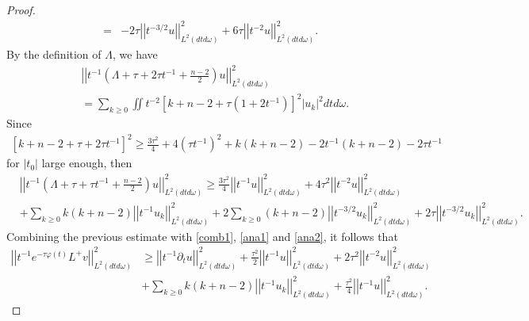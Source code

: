 \documentclass[11pt]{amsart}
\theoremstyle{plain}
\numberwithin{equation}{section}
\begin{document}
\begin{proof}
\begin{eqnarray}
&=& - 2 \tau {\left\vert\left\vert { t^{-3/2}u}\right\vert\right\vert}^2_{L^2{\left( {dt d{\omega}} \right) }} + 6 \tau {\left\vert\left\vert {
t^{-2} u}\right\vert\right\vert}^2_{L^2{\left( {d t d{\omega}} \right) }} . \label{ana2}
\end{eqnarray}
By the definition of $\Lambda$, we have
\begin{eqnarray}
&&{\left\vert\left\vert { t^{-1}{\left( {\Lambda +\tau +2\tau t^{-1} +\frac{n-2}{2}} \right) } u
}\right\vert\right\vert}^2_{L^2(dtd\omega)} \nonumber \\ &&=  \sum_{k \ge 0} \iint
t^{-2}{\left[{k+ n-2 + \tau {\left( {1 + 2 t^{-1}} \right) }}\right]}^2 {\left\vert{u_k}\right\vert}^2 dt d{\omega}.
\end{eqnarray}
Since
\begin{align*}
{\left[{k+n -2 + \tau+2\tau t^{-1}}\right]}^2
\geq \frac{3\tau^2}{4} +4(\tau t^{-1})^2 +k(k+n-2) - 2 t^{-1}{\left( {k + n - 2} \right) } - 2 \tau t^{-1}
\end{align*}
for $|t_0|$ large enough, then
\begin{align*}
&{\left\vert\left\vert { t^{-1}{\left( {\Lambda +\tau +\tau t^{-1} +\frac{n-2}{2}} \right) }
u}\right\vert\right\vert}^2_{L^2(dtd\omega)} \ge
\frac{3\tau^2}{4}{\left\vert\left\vert {t^{-1}u}\right\vert\right\vert}^2_{L^2(dtd\omega)}
+ 4\tau^2 {\left\vert\left\vert {t^{-2}u}\right\vert\right\vert}^2_{L^2(dtd\omega)} \\
&+\sum_{k\geq 0}  k(k+n-2) {\left\vert\left\vert {t^{-1}u_k}\right\vert\right\vert}^2_{L^2(dtd\omega)}
+ 2 \sum_{k\geq0} {\left( {k + n - 2} \right) } {\left\vert\left\vert {t^{-3/2}u_k}\right\vert\right\vert}^2_{L^2(dtd\omega)}
+ 2 \tau {\left\vert\left\vert {t^{-3/2}u_k}\right\vert\right\vert}^2_{L^2(dtd\omega)}.
\end{align*}
Combining the previous estimate with \eqref{comb1}, \eqref{ana1} and \eqref{ana2}, it follows
that
\begin{align*}
{\left\vert\left\vert {t^{-1} e^{-\tau\varphi(t)}L^+v}\right\vert\right\vert}^2_{L^2(dtd\omega)}
&\ge {\left\vert\left\vert {t^{-1} \partial_t u }\right\vert\right\vert}^2_{L^2(dtd\omega)}
+ \frac{\tau^2}{2} {\left\vert\left\vert {t^{-1}u}\right\vert\right\vert}^2_{L^2(dtd\omega)}
+ 2\tau^2 {\left\vert\left\vert {t^{-2}u}\right\vert\right\vert}^2_{L^2(dtd\omega)} \\
&+ \sum_{k\geq 0}  k(k+n-2){\left\vert\left\vert {t^{-1}u_k}\right\vert\right\vert}^2_{L^2(dtd\omega)}
+ \frac{\tau^2}{4} {\left\vert\left\vert {t^{-1}u}\right\vert\right\vert}^2_{L^2(dtd\omega)} .

\end{align*}
\end{proof}
\end{document}
